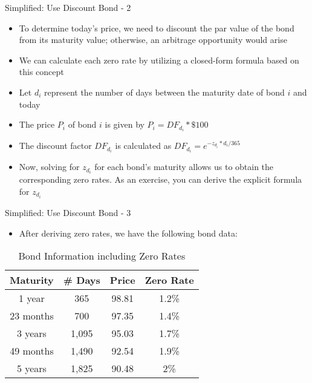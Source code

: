 \documentclass[handout, aspectratio=169]{beamer}
\begin{document}
\begin{frame}{Simplified: Use Discount Bond - 2}
	\begin{itemize}
		\item To determine today's price, we need to discount the par value of the bond from its maturity value; otherwise, an arbitrage opportunity would arise
		\item We can calculate each zero rate by utilizing a closed-form formula based on this concept
		\item Let $d_i$ represent the number of days between the maturity date of bond $i$ and today
		\item The price $P_i$ of bond $i$ is given by $P_i = DF_{d_i} * \$100$
		\item The discount factor $DF_{d_i}$ is calculated as $DF_{d_i} = e^{-z_{d_i} * d_i / 365}$
		\item Now, solving for $z_{d_i}$ for each bond's maturity allows us to obtain the corresponding zero rates. As an exercise, you can derive the explicit formula for $z_{d_i}$
	\end{itemize}
\end{frame}

\begin{frame}{Simplified: Use Discount Bond - 3}
	\begin{itemize}
		\item After deriving zero rates, we have the following bond data:
	\end{itemize}
	\begin{table}[h]
		\centering
   		\begin{tabular}{|c|c|c|c|} 
	 		\hline
	 		\textbf{Maturity} & \textbf{\# Days}  & \textbf{Price} & \textbf{Zero Rate}\\				
	 			\hline
	 			1 year & 365 & 98.81 & 1.2\% \\ 
	 			23 months & 700 & 97.35 & 1.4\% \\ 
	 			3 years & 1,095 & 95.03 & 1.7\% \\ 
	 			49 months & 1,490 & 92.54 & 1.9\% \\ 
	 			5 years & 1,825 & 90.48 & 2\% \\ 
	 			\hline
   		\end{tabular}
	   \caption{Bond Information including Zero Rates}
	\end{table}
\end{frame}
\end{document}
